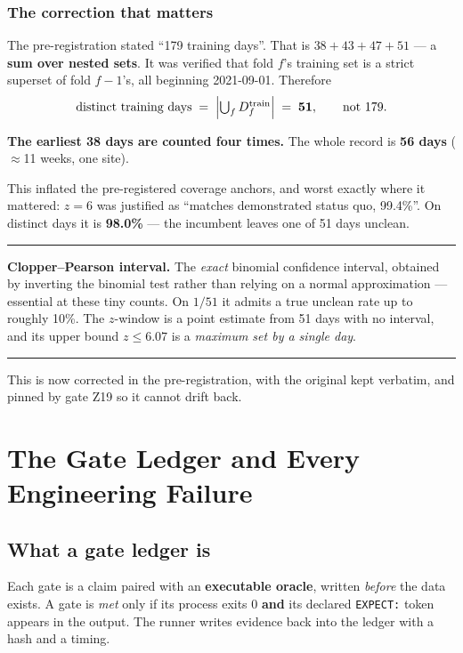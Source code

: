 \documentclass[11pt,a4paper]{article}
\newenvironment{keybox}
  {\par\medskip\noindent\rule{\linewidth}{0.9pt}\par\nobreak\smallskip\ignorespaces}
  {\par\smallskip\nobreak\noindent\rule{\linewidth}{0.9pt}\par\medskip}
\begin{document}
\subsubsection*{The correction that matters}

The pre-registration stated ``179 training days''. That is $38+43+47+51$ --- a
\textbf{sum over nested sets}. It was verified that fold $f$'s training set is a
strict superset of fold $f-1$'s, all beginning 2021-09-01. Therefore
\begin{equation}
  \text{distinct training days}
  \;=\; \Bigl|\textstyle\bigcup_f D_f^{\mathrm{train}}\Bigr|
  \;=\; \mathbf{51}, \qquad\text{not } 179 .
  \label{eq:distinct}
\end{equation}

\textbf{The earliest 38 days are counted four times.} The whole record is
\textbf{56 days} ($\approx$11 weeks, one site).

This inflated the pre-registered coverage anchors, and worst exactly where it
mattered: $z=6$ was justified as ``matches demonstrated status quo, 99.4\%''. On
distinct days it is \textbf{98.0\%} --- the incumbent leaves one of 51 days
unclean.

\begin{keybox}
\textbf{Clopper--Pearson interval.} The \emph{exact} binomial confidence
interval, obtained by inverting the binomial test rather than relying on a
normal approximation --- essential at these tiny counts. On $1/51$ it admits a
true unclean rate up to roughly 10\%. The $z$-window is a point estimate from
51 days with no interval, and its upper bound $z\le6.07$ is a \emph{maximum set
by a single day}.
\end{keybox}

This is now corrected in the pre-registration, with the original kept verbatim,
and pinned by gate Z19 so it cannot drift back.

\section{The Gate Ledger and Every Engineering Failure}

\subsection{What a gate ledger is}

Each gate is a claim paired with an \textbf{executable oracle}, written
\emph{before} the data exists. A gate is \emph{met} only if its process exits 0
\textbf{and} its declared \texttt{EXPECT:} token appears in the output. The
runner writes evidence back into the ledger with a hash and a timing.
\end{document}
